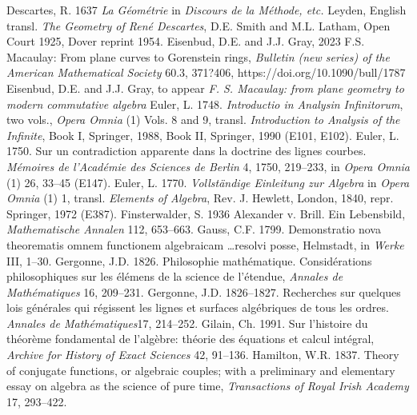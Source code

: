\newline\indent Descartes, R. 1637 \emph{La G\'eom\'etrie} in \emph{Discours de la M\'ethode, etc.} Leyden, English transl. \emph{The Geometry of Ren\'e Descartes}, D.E. Smith and M.L. Latham, Open Court 1925, Dover reprint 1954.
\newline\indent Eisenbud, D.E. and J.J. Gray, 2023 F.S. Macaulay: From plane curves to Gorenstein rings, \emph{Bulletin (new series) of the American Mathematical Society} 
60.3,  371?406, https://doi.org/10.1090/bull/1787
\newline\indent Eisenbud, D.E. and J.J. Gray, to appear \emph{F. S. Macaulay: from plane geometry to modern commutative algebra}
\newline\indent  Euler, L. 1748. \emph{Introductio in Analysin Infinitorum}, two vols., \emph{Opera Omnia} (1) Vols. 8 and 9, transl. \emph{Introduction to Analysis of the Infinite}, Book I,  Springer, 1988, Book II, Springer, 1990 (E101, E102).
\newline\indent  Euler, L. 1750.  Sur un contradiction apparente dans la doctrine des lignes courbes. \emph{M\'emoires de l'Acad\'emie des Sciences de Berlin} 4, 1750, 219--233, in  \emph{Opera Omnia} (1)   26, 33--45 (E147).
\newline\indent Euler, L. 1770. \emph{Vollst\"andige Einleitung zur Algebra} in \emph{Opera Omnia} (1) 1,  transl. \emph{Elements of Algebra}, Rev. J. Hewlett, London, 1840, repr.  Springer, 1972 (E387).
\newline\indent Finsterwalder, S. 1936 Alexander v. Brill. Ein Lebensbild, \emph{Mathematische Annalen} 112, 653--663.
\newline\indent Gauss, C.F.  1799. Demonstratio nova theorematis omnem functionem algebraicam \ldots resolvi posse, Helmstadt, in \emph{Werke} III, 1--30.
\newline\indent Gergonne, J.D. 1826. Philosophie math\'ematique. Consid\'erations philo\-sophiques sur les \'el\'emens de la science de l'\'etendue, \emph{Annales de Math\'ematiques} 16, 209--231.
\newline\indent Gergonne, J.D. 1826--1827. Recherches sur quelques lois g\'en\'erales qui r\'egissent les lignes et surfaces alg\'ebriques de tous les ordres. \emph{Annales de Math\'ematiques}17, 214--252. 
 \newline\indent  Gilain, Ch. 1991. Sur l'histoire du th\'eor\`eme  fondamental de l'alg\`ebre: th\'eorie des \'equations et calcul int\'egral, \emph{Archive for History of Exact Sciences} 42, 91--136. 
 \newline\indent Hamilton, W.R.  1837. Theory of conjugate functions, or algebraic couples; with a preliminary and elementary essay on algebra as the science of pure time, \emph{Transactions of Royal Irish Academy}  17, 293--422. 
